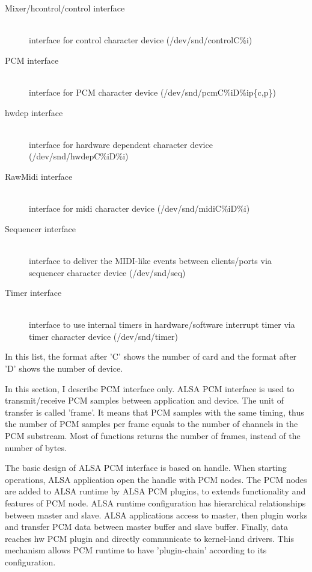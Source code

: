 \documentclass[onecolumn]{article}
\begin{document}
\begin{description}
\item[Mixer/hcontrol/control interface] \mbox{} \\
interface for control character device (/dev/snd/controlC\%i)
\item[PCM interface] \mbox{} \\
interface for PCM character device (/dev/snd/pcmC\%iD\%ip\{c,p\})
\item[hwdep interface] \mbox{} \\
interface for hardware dependent character device (/dev/snd/hwdepC\%iD\%i)
\item[RawMidi interface] \mbox{} \\
interface for midi character device (/dev/snd/midiC\%iD\%i)
\item[Sequencer interface] \mbox{} \\
interface to deliver the MIDI-like events between clients/ports via sequencer character device (/dev/snd/seq)
\item[Timer interface] \mbox{} \\
interface to use internal timers in hardware/software interrupt timer via timer character device (/dev/snd/timer)
\end{description}

In this list, the format after 'C' shows the number of card and the format after 'D' shows the number of device.

In this section, I describe PCM interface only. ALSA PCM interface is used to transmit/receive PCM samples between application and device. The unit of transfer is called 'frame'. It means that PCM samples with the same timing, thus the number of PCM samples per frame equals to the number of channels in the PCM substream. Most of functions returns the number of frames, instead of the number of bytes.

The basic design of ALSA PCM interface is based on handle. When starting operations, ALSA application open the handle with PCM nodes. The PCM nodes are added to ALSA runtime by ALSA PCM plugins, to extends functionality and features of PCM node. ALSA runtime configuration has hierarchical relationships between master and slave. ALSA applications access to master, then plugin works and transfer PCM data between master buffer and slave buffer. Finally, data reaches hw PCM plugin and directly communicate to kernel-land drivers. This mechanism allows PCM runtime to have 'plugin-chain' according to its configuration. 
\end{document}
